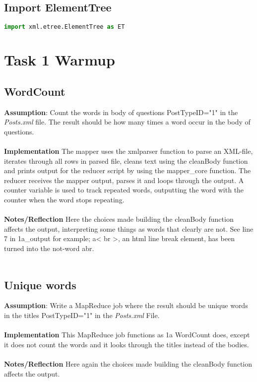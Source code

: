 \documentclass[fleqn,10pt]{wlscirep}
\begin{document}
\subsection{Import ElementTree}
\begin{lstlisting}[language=Python, caption= Import for ElementTree]
import xml.etree.ElementTree as ET
\end{lstlisting}
\section{Task 1 Warmup}
\subsection{WordCount}
\textbf{Assumption}: Count the words in body of questions PostTypeID="1"  in the \textit{Posts.xml}  file. The result should be how many times a word occur in the body of questions.\\ \\
\textbf{Implementation} The mapper uses the xmlparser function to parse an XML-file, iterates through all rows in parsed file, cleans text using the cleanBody function and prints output for the reducer script by using the mapper\_core function.
The reducer receives the mapper output, parses it and loops through the output. A counter variable is used to track repeated words, outputting the word with the counter when the word stops repeating. \\ \\
\textbf{Notes/Reflection} Here the choices made building the cleanBody function affects the output, interpreting some things as words that clearly are not. See line 7 in 1a\_output for example; a< br >, an html line break element, has been turned into the not-word abr. \\ \\



\subsection{Unique words}
\textbf{Assumption}: Write a MapReduce job where the result should be unique words in the titles PostTypeID="1" in the \textit{Posts.xml} File. \\ \\
\textbf{Implementation} This MapReduce job functions as 1a WordCount does, except it does not count the words and it looks through the titles instead of the bodies. \\ \\
\textbf{Notes/Reflection} Here again the choices made building the cleanBody function affects the output.

\end{document}
